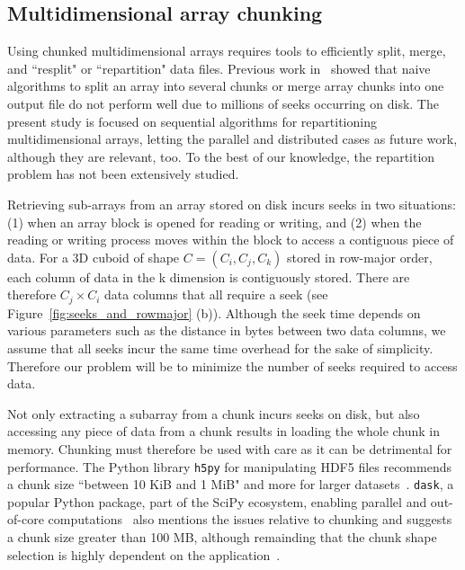 \documentclass[conference]{IEEEtran}
\begin{document}
\subsection{Multidimensional array chunking}

Using chunked multidimensional arrays requires tools to efficiently split,
merge, and ``resplit" or ``repartition" data files. Previous work in~\cite{seqalgorithms}
showed that naive algorithms to split an array into several chunks or merge
array chunks into one output file do not perform well due to millions of seeks
occurring on disk. The present study is focused on sequential algorithms for
repartitioning multidimensional arrays, letting the parallel and distributed
cases as future work, although they are relevant, too. To the best of our
knowledge, the repartition problem has not been extensively studied.

Retrieving sub-arrays from an array stored on disk incurs seeks in two
situations: (1) when an array block is opened for reading or writing, and (2)
when the reading or writing process moves within the block to access a
contiguous piece of data. For a 3D cuboid of shape $C = (C_i, C_j, C_k)$ stored
in row-major order, each column of data in the k dimension is contiguously
stored. There are therefore $C_j \times C_i$ data columns that all require a
seek (see Figure~\ref{fig:seeks_and_rowmajor} (b)).
Although the seek time depends on various parameters such as the distance
in bytes between two data columns, we assume that all seeks incur the same time
overhead for the sake of simplicity. Therefore our problem will be to minimize
the number of seeks required to access data.

Not only extracting a subarray from a chunk incurs seeks on disk, but also
accessing any piece of data from a chunk results in loading the whole chunk in
memory. Chunking must therefore be used with care as it can be detrimental for
performance. The Python library \texttt{h5py} for manipulating HDF5 files
recommends a chunk size ``between 10 KiB and 1 MiB" and more for larger
datasets~\cite{collette_2014}. \texttt{dask}, a popular Python package, part of
the SciPy ecosystem, enabling parallel and out-of-core
computations~\cite{matthew_rocklin-proc-scipy-2015} also mentions the issues
relative to chunking and suggests a chunk size greater than 100 MB, although
remainding that the chunk shape selection is highly dependent on the
application~\cite{rocklin_bourbeau_2019}.
\end{document}

